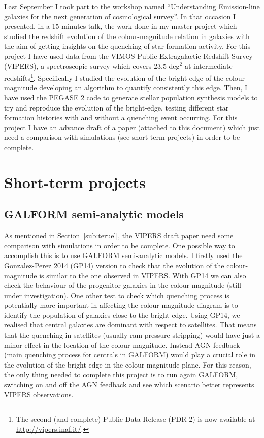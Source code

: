 \documentclass[letterpaper]{article}
\begin{document}
Last September I took part to the workshop named ``Understanding Emission-line galaxies for the next generation of cosmological survey''. In that occasion I presented, in a 15 minutes talk, the work done in my master project which studied the redshift evolution of the colour-magnitude relation in galaxies with the aim of getting insights on the quenching of star-formation activity. For this project I have used data from the VIMOS Public Extragalactic Redshift Survey (VIPERS), a spectroscopic survey which covers $23.5$ deg$^2$ at intermediate redshifts\footnote{The second (and complete) Public Data Release (PDR-2) is now available at \url{http://vipers.inaf.it/}. }. Specifically I studied the evolution of the bright-edge of the colour-magnitude developing an algorithm to quantify consistently this edge. Then, I have used the PEGASE 2 code to generate stellar population synthesis models to try and reproduce the evolution of the bright-edge, testing different star formation histories with and without a quenching event occurring. For this project I have an advance draft of a paper (attached to this document) which just need a comparison with simulations (see short term projects) in order to be complete.


\section{Short-term projects}

\subsection{GALFORM semi-analytic models}
As mentioned in Section~\ref{sub:teruel}, the VIPERS draft paper need some comparison with simulations in order to be complete. One possible way to accomplish this is to use GALFORM semi-analytic models. I firstly used the Gonzalez-Perez 2014 (GP14) version to check that the evolution of the colour-magnitude is similar to the one observed in VIPERS. With GP14 we can also check the behaviour of the progenitor galaxies in the colour magnitude (still under investigation). One other test to check which quenching process is potentially more important in affecting the colour-magnitude diagram is to identify the population of galaxies close to the bright-edge. Using GP14, we realised that central galaxies are dominant with respect to satellites. That means that the quenching in satellites (usually ram pressure stripping) would have just a minor effect in the location of the colour-magnitude. Instead AGN feedback (main quenching process for centrals in GALFORM) would play a crucial role in the evolution of the bright-edge in the colour-magnitude plane. For this reason, the only thing needed to complete this project is to run again GALFORM, switching on and off the AGN feedback and see which scenario better represents VIPERS observations. 
\end{document}
